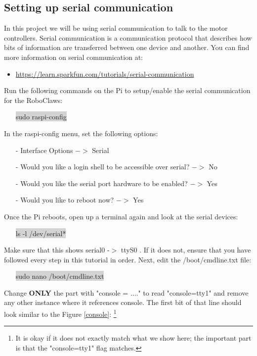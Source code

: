\documentclass{article}
\begin{document}
\subsection{Setting up serial communication}	

In this project we will be using serial communication to talk to the motor controllers. Serial communication is a communication protocol that describes how bits of information are transferred between one device and another. You can find more information on serial communication at:
\begin{itemize}
	\item \href{https://learn.sparkfun.com/tutorials/serial-communication}{https://learn.sparkfun.com/tutorials/serial-communication}
\end{itemize}

\noindent Run the following commands on the Pi to setup/enable the serial communication for the RoboClaws:
\begin{itemize}
	\item[] \colorbox{lightgray}{sudo raspi-config}
\end{itemize}

\noindent In the raspi-config menu, set the following options:
\begin{itemize}
	\item[-]  Interface Options $-> $ Serial 
	\item[-] Would you like a login shell to be accessible over serial? $->$ No
	\item[-] Would you like the serial port hardware to be enabled? $->$ Yes
	\item[-] Would you like to reboot now? $->$ Yes
\end{itemize} 
\noindent Once the Pi reboots, open up a terminal again and look at the serial devices:
\begin{itemize}
	\item[] \colorbox{lightgray}{ls -l /dev/serial*}
\end{itemize}
Make sure that this shows serial0 -$>$ ttyS0 . If it does not, ensure that you have followed every step in this tutorial in order. Next, edit the /boot/cmdline.txt file:
\begin{itemize}
	\item [] \colorbox{lightgray}{sudo nano /boot/cmdline.txt}
\end{itemize}

\noindent Change \textbf{ONLY} the part with "console = ...." to read "console=tty1" and remove any other instance where it references console. The first bit of that line should look similar to the Figure \ref{console}: \footnote{It is okay if it does not exactly match what we show here; the important part is that the "console=tty1" flag matches.}
\end{document}
